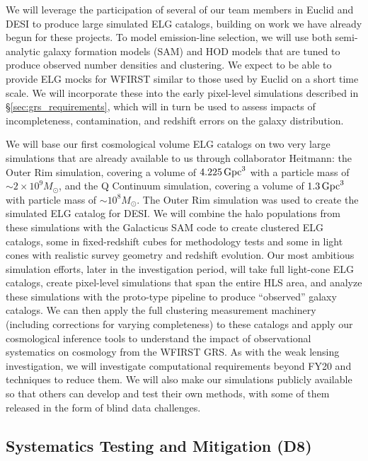 We will leverage the participation of several of our team members in
Euclid and DESI to produce large simulated ELG catalogs,
building on work we have already begun for these projects.
To model emission-line selection, we will use both semi-analytic galaxy
formation models (SAM) and HOD models that are tuned to produce
observed number densities and clustering.
We expect to be able to provide ELG mocks for WFIRST similar to those used
by Euclid on a short time scale.
We will incorporate these into the early pixel-level
simulations described in \S\ref{sec:grs_requirements},
which will in turn be used to assess impacts of incompleteness,
contamination, and redshift errors on the galaxy distribution.

We will base our first cosmological volume ELG catalogs on two very large simulations
that are already available to us through collaborator Heitmann:
the Outer Rim simulation, covering
a volume of $4.225\,{\rm Gpc}^3$ with a particle mass of
$\sim 2\times 10^9 M_\odot$,
and the Q Continuum simulation, covering a volume of $1.3\,{\rm Gpc}^3$
with particle mass of $\sim 10^8 M_\odot$.
The Outer Rim simulation was used to create the simulated ELG
catalog for DESI.
We will combine the halo populations from these simulations with the
Galacticus SAM code \cite{Benson2010} to create clustered ELG catalogs,
some in fixed-redshift cubes for methodology tests and some in light cones
with realistic survey geometry and redshift evolution.
Our most ambitious simulation efforts, later in the investigation
period, will take full light-cone ELG catalogs, create pixel-level
simulations that span the entire HLS area, and analyze these simulations
with the proto-type pipeline to produce ``observed'' galaxy catalogs.
We can then apply the full clustering measurement machinery
(including corrections for varying completeness) to these catalogs
and apply our cosmological inference tools
to understand the impact of observational systematics on
cosmology from the WFIRST GRS.
As with the weak lensing investigation, we will investigate computational
requirements beyond FY20 and techniques to reduce them. We will also make our
simulations publicly available so that others can develop and
test their own methods, with some of them released in the form of blind
data challenges.

\subsection{Systematics Testing and Mitigation (D8)}
\label{sec:gal_syst}


